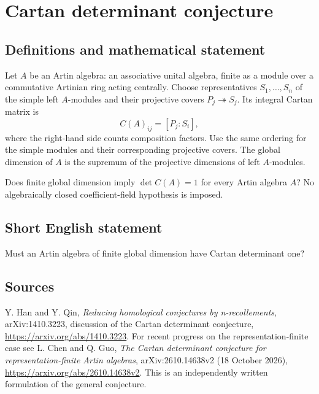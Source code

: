 \documentclass{article}
\begin{document}
\section*{Cartan determinant conjecture}
\subsection{Definitions and mathematical statement}
Let $A$ be an Artin algebra: an associative unital algebra, finite as a module
over a commutative Artinian ring acting centrally. Choose representatives
$S_1,\ldots,S_n$ of the simple left $A$-modules and their projective covers
$P_j\twoheadrightarrow S_j$. Its integral Cartan matrix is
\[
 C(A)_{ij}=[P_j:S_i],
\]
where the right-hand side counts composition factors. Use the same ordering
for the simple modules and their corresponding projective covers.
The global dimension of $A$ is the supremum of the projective dimensions of
left $A$-modules.

Does finite global dimension imply $\det C(A)=1$ for every Artin algebra $A$?
No algebraically closed coefficient-field hypothesis is imposed.

\subsection{Short English statement}
Must an Artin algebra of finite global dimension have Cartan determinant one?

\subsection{Sources}
Y. Han and Y. Qin,
\emph{Reducing homological conjectures by n-recollements}, arXiv:1410.3223,
discussion of the Cartan determinant conjecture,
\url{https://arxiv.org/abs/1410.3223}.
For recent progress on the representation-finite case see L. Chen and
Q. Guo, \emph{The Cartan determinant conjecture for representation-finite
Artin algebras}, arXiv:2610.14638v2 (18 October 2026),
\url{https://arxiv.org/abs/2610.14638v2}.
This is an independently written formulation of the general conjecture.
\end{document}
